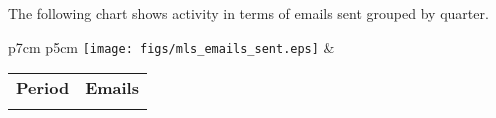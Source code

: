 

The following chart shows activity in terms of emails sent grouped by quarter.

\begin{tabular}{p{7cm} p{5cm}}
    \vspace{0pt} 
    \texttt{[image: figs/mls\_emails\_sent.eps]}
    & 
    \vspace{0pt}
    \begin{tabular}{l|l}%
    \bfseries Period & \bfseries Emails %
    \csvreader[head to column names]{data/mls_emails_sent.csv}{}%
    {\\ & \emailssent}
    \end{tabular}
\end{tabular}





